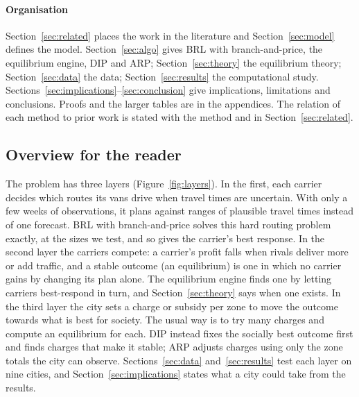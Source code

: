 \documentclass[preprint,12pt]{elsarticle}
\theoremstyle{definition}
\theoremstyle{remark}
\begin{document}
\paragraph{Organisation} Section~\ref{sec:related} places the work in the literature and Section~\ref{sec:model} defines the model. Section~\ref{sec:algo} gives BRL with branch-and-price, the equilibrium engine, DIP and ARP; Section~\ref{sec:theory} the equilibrium theory; Section~\ref{sec:data} the data; Section~\ref{sec:results} the computational study. Sections~\ref{sec:implications}--\ref{sec:conclusion} give implications, limitations and conclusions. Proofs and the larger tables are in the appendices. The relation of each method to prior work is stated with the method and in Section~\ref{sec:related}.

\subsection{Overview for the reader}\label{sec:overview}

The problem has three layers (Figure~\ref{fig:layers}). In the first, each carrier decides which routes its vans drive when travel times are uncertain. With only a few weeks of observations, it plans against ranges of plausible travel times instead of one forecast. BRL with branch-and-price solves this hard routing problem exactly, at the sizes we test, and so gives the carrier's best response. In the second layer the carriers compete: a carrier's profit falls when rivals deliver more or add traffic, and a stable outcome (an equilibrium) is one in which no carrier gains by changing its plan alone. The equilibrium engine finds one by letting carriers best-respond in turn, and Section~\ref{sec:theory} says when one exists. In the third layer the city sets a charge or subsidy per zone to move the outcome towards what is best for society. The usual way is to try many charges and compute an equilibrium for each. DIP instead fixes the socially best outcome first and finds charges that make it stable; ARP adjusts charges using only the zone totals the city can observe. Sections~\ref{sec:data} and~\ref{sec:results} test each layer on nine cities, and Section~\ref{sec:implications} states what a city could take from the results.
\end{document}
